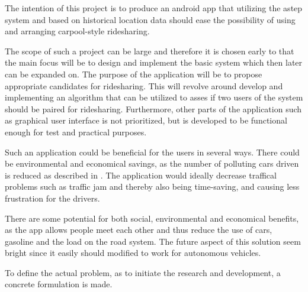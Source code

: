 The intention of this project is to produce an android app that utilizing the \gls{astep} system and based on historical location data should ease the possibility of using and arranging carpool-style ridesharing.

The scope of such a project can be large and therefore it is chosen early to that the main focus will be to design and implement the basic system which then later can be expanded on.
The purpose of the application will be to propose appropriate candidates for ridesharing.
This will revolve around develop and implementing an algorithm that can be utilized to asses if two users of the system should be paired for ridesharing.
Furthermore, other parts of the application such as graphical user interface is not prioritized, but is developed to be functional enough for test and practical purposes.

Such an application could be beneficial for the users in several ways. There could be environmental and economical savings, as the number of polluting cars driven is reduced as described in \cite{doi:10.1080/01441647.2011.621557}. The application would ideally decrease traffical problems such as traffic jam and thereby also being time-saving, and causing less frustration for the drivers.

There are some potential for both social, environmental and economical benefits, as the app allows people meet each other and thus reduce the use of cars, gasoline and the load on the road system.
The future aspect of this solution seem bright since it easily should modified to work for autonomous vehicles.

To define the actual problem, as to initiate the research and development, a concrete formulation is made.